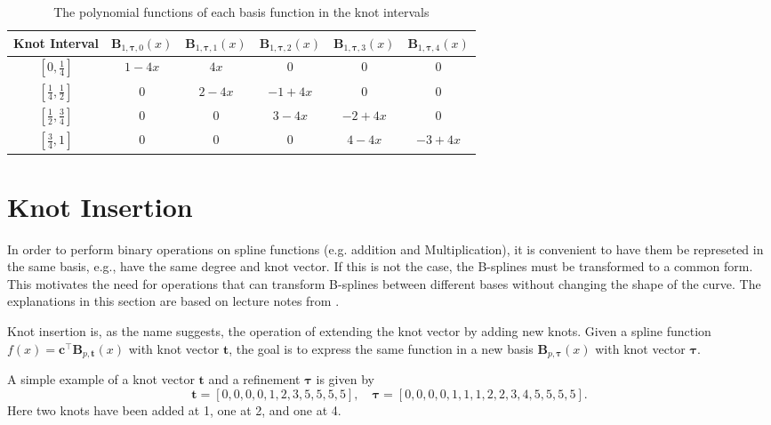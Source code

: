 \begin{example}
    \begin{table*}[h]
        \centering
        \begin{tabular}{c|c|c|c|c|c}
            Knot Interval & $\mathbf B_{1, \boldsymbol\tau, 0}(x)$ & $\mathbf B_{1, \boldsymbol\tau, 1}(x)$ & $\mathbf B_{1, \boldsymbol\tau, 2}(x)$ & $\mathbf B_{1, \boldsymbol\tau, 3}(x)$ & $\mathbf B_{1, \boldsymbol\tau, 4}(x)$ \\
            \hline
            \rule{0pt}{2.5ex} $\left[0,\frac{1}{4}\right]$ & $1-4x$ & $4x$ & 0 & 0 & 0 \\[5pt]
            \rule{0pt}{2.5ex} $\left[\frac{1}{4},\frac{1}{2}\right]$ & 0 & $2-4x$ & $-1+4x$ & 0 & 0 \\[5pt]
            \rule{0pt}{2.5ex} $\left[\frac{1}{2},\frac{3}{4}\right]$ & 0 & 0 & $3-4x$ & $-2+4x$ & 0 \\[5pt]
            \rule{0pt}{2.5ex} $\left[\frac{3}{4},1\right]$ & 0 & 0 & 0 & $4-4x$ & $-3+4x$ \\[5pt]
        \end{tabular}
        \caption{The polynomial functions of each basis function in the knot intervals}
        \label{tab:linear-spline-evaluation}
    \end{table*}
\end{example}

\section{Knot Insertion}
In order to perform binary operations on spline functions (e.g. addition and Multiplication), it is convenient to have them be represeted in the same basis, e.g., have the same degree and knot vector. If this is not the case, the B-splines must be transformed to a common form. This motivates the need for operations that can transform B-splines between different bases without changing the shape of the curve. The explanations in this section are based on lecture notes from \cite{bspline-uio}.

Knot insertion is, as the name suggests, the operation of extending the knot vector by adding new knots. Given a spline function $f(x) = \mathbf{c}^{\top} \mathbf{B}_{p, \mathbf{t}}(x)$ with knot vector $\mathbf t$, the goal is to express the same function in a new basis $\mathbf{B}_{p, \boldsymbol{\tau}}(x)$ with knot vector $\boldsymbol{\tau}$.

A simple example of a knot vector $\mathbf t$ and a refinement $\boldsymbol \tau$ is given by
$$
    \mathbf t = [0, 0, 0, 0, 1, 2, 3, 5, 5, 5, 5], \quad \boldsymbol \tau = [0, 0, 0, 0, 1, 1, 1, 2, 2, 3, 4, 5, 5, 5, 5].
$$
Here two knots have been added at 1, one at 2, and one at 4.

